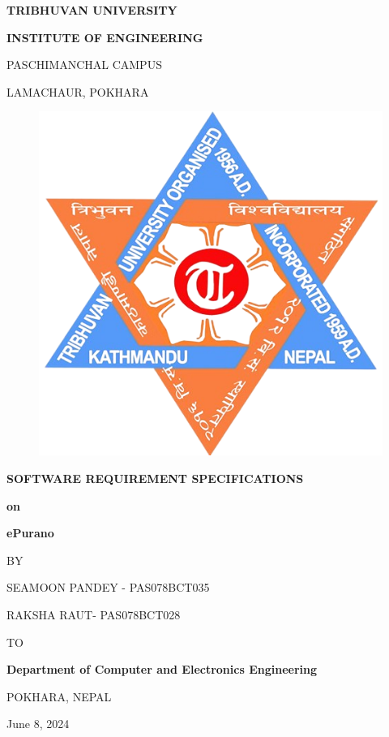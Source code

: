 \begin{titlepage}
    \thispagestyle{empty}
    \begin{center}
    
    \vspace*{\fill} %
    {\large \textbf{TRIBHUVAN UNIVERSITY
}\par}
{\large \textbf{INSTITUTE OF ENGINEERING
}\par}
\vspace{8pt}
PASCHIMANCHAL CAMPUS

LAMACHAUR, POKHARA
\vspace{24pt}

\begin{figure}[ht]
    \centering
    \includegraphics[scale=0.25]{../images/ioe-logo.png}
\end{figure}
\vspace{24pt}
{\textbf{SOFTWARE REQUIREMENT SPECIFICATIONS}\par \textbf{on} \par}
\vspace{14pt}
{\textbf{ ePurano }\par}

\vspace{14pt}
{BY\par}
\vspace{14pt}
    
{SEAMOON PANDEY - PAS078BCT035\par}
{RAKSHA RAUT- PAS078BCT028\par}

\vspace{24pt}
{TO\par}
\vspace{14pt}
{\textbf{Department of Computer and
Electronics Engineering}\par}
{POKHARA, NEPAL\par}
{June 8, 2024\par}

    \vspace*{\fill}

    \end{center}
\end{titlepage}